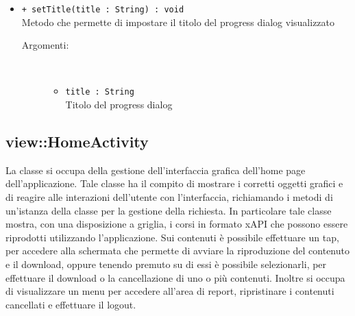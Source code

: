 \documentclass[../Tesi.tex]{subfiles}
\begin{document}
\begin{description}
\begin{itemize}
				\item \texttt{+ setTitle(title : String) : void}\\
				Metodo che permette di impostare il titolo del progress dialog visualizzato
				\begin{description}
					\item[Argomenti:] \
					\begin{itemize}
						\item \texttt{title : String}\\
						Titolo del progress dialog
					\end{itemize}
				\end{description}
			\end{itemize}
		\end{description}

		\subsection{view::HomeActivity}
		La classe  si occupa della gestione dell'interfaccia grafica dell'home page dell'applicazione. Tale classe ha il compito di mostrare i corretti oggetti grafici e di reagire alle interazioni dell'utente con l'interfaccia, richiamando i metodi di un'istanza della classe  per la gestione della richiesta. In particolare tale classe mostra, con una disposizione a griglia, i corsi in formato xAPI che possono essere riprodotti utilizzando l'applicazione. Sui contenuti è possibile effettuare un tap, per accedere alla schermata che permette di avviare la riproduzione del contenuto e il download, oppure tenendo premuto su di essi è possibile selezionarli, per effettuare il download o la cancellazione di uno o più contenuti. Inoltre si occupa di visualizzare un menu per accedere all'area di report, ripristinare i contenuti cancellati e effettuare il logout.
\end{document}
